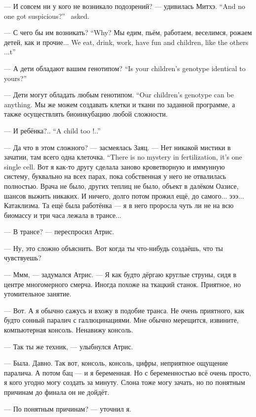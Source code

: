 {--- И совсем ни у кого не возникало подозрений? --- удивилась Митхэ.}
{``And no one got suspicious?'' \Mitchoe\ asked.}

{--- С чего бы им возникать?}
{``Why?}
{Мы едим, пьём, работаем, веселимся, рожаем детей, как и прочие...}
{We eat, drink, work, have fun and children, like the others ...t''}

{--- А дети обладают вашим генотипом?}
{``Is your children's genotype identical to yours?''}

{--- Дети могут обладать любым генотипом.}
{``Our children's genotype can be anything.}
Мы же можем создавать клетки и ткани по заданной программе, а также осуществлять биоинкубацию любой сложности.

{--- И ребёнка?..}
{``A child too !..''}

--- Да что в этом сложного? --- засмеялась Заяц.
{--- Нет никакой мистики в зачатии, там всего одна клеточка.}
{``There is no mystery in fertilization, it's one single cell.}
Вот я как-то другу сделала заново кроветворную и иммунную систему, буквально на всех парах, пока собственная у него не отвалилась полностью.
Врача не было, других теплиц не было, объект в далёком Оазисе, шансов выжить никаких.
И ничего, долго потом прожил ещё, до самого... эээ... Катаклизма.
Та ещё была работёнка --- я в него проросла чуть ли не на всю биомассу и три часа лежала в трансе...

--- В трансе? --- переспросил Атрис.

--- Ну, это сложно объяснить.
Вот когда ты что-нибудь создаёшь, что ты чувствуешь?

--- Ммм, --- задумался Атрис.
--- Я как будто дёргаю круглые струны, сидя в центре многомерного смерча.
Иногда похоже на ткацкий станок.
Приятное, но утомительное занятие.

--- Вот.
А я обычно сажусь и вхожу в подобие транса.
Не очень приятного, как будто сонный паралич с галлюцинациями.
Мне обычно мерещится, извините, компьютерная консоль.
Ненавижу консоль.

--- Так ты же техник, --- улыбнулся Атрис.

--- Была.
Давно.
Так вот, консоль, консоль, цифры, неприятное ощущение паралича.
А потом бац --- и я беременная.
Но с беременностью всё очень просто, я кого угодно могу создать за минуту.
Слона тоже могу зачать, но по понятным причинам до финала он не дойдёт.

--- По понятным причинам? --- уточнил я.

